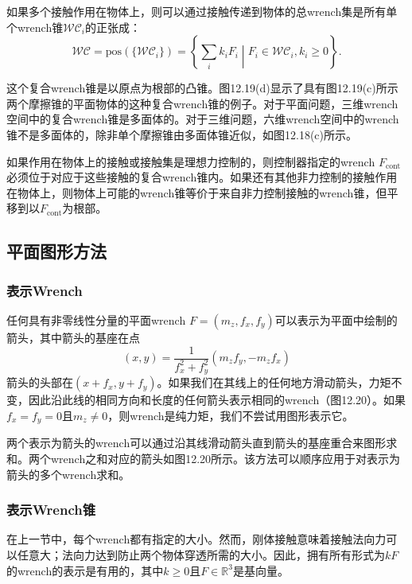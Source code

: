 \documentclass[12pt,a4paper]{article}
\begin{document}
如果多个接触作用在物体上，则可以通过接触传递到物体的总wrench集是所有单个wrench锥$\mathcal{WC}_i$的正张成：
\begin{equation}
\mathcal{WC} = \text{pos}(\{\mathcal{WC}_i\}) = \left\{\sum_i k_i F_i \middle| F_i \in \mathcal{WC}_i, k_i \geq 0 \right\}.
\end{equation}

这个复合wrench锥是以原点为根部的凸锥。图12.19(d)显示了具有图12.19(c)所示两个摩擦锥的平面物体的这种复合wrench锥的例子。对于平面问题，三维wrench空间中的复合wrench锥是多面体的。对于三维问题，六维wrench空间中的wrench锥不是多面体的，除非单个摩擦锥由多面体锥近似，如图12.18(c)所示。

如果作用在物体上的接触或接触集是理想力控制的，则控制器指定的wrench $F_{\text{cont}}$必须位于对应于这些接触的复合wrench锥内。如果还有其他非力控制的接触作用在物体上，则物体上可能的wrench锥等价于来自非力控制接触的wrench锥，但平移到以$F_{\text{cont}}$为根部。

\subsection{平面图形方法}
\label{subsec:planar_graphical_methods_force}

\subsubsection{表示Wrench}
\label{subsubsec:representing_wrenches}

任何具有非零线性分量的平面wrench $F = (m_z, f_x, f_y)$可以表示为平面中绘制的箭头，其中箭头的基座在点
\begin{equation}
(x, y) = \frac{1}{f_x^2 + f_y^2} (m_z f_y, -m_z f_x)
\end{equation}
箭头的头部在$(x + f_x, y + f_y)$。如果我们在其线上的任何地方滑动箭头，力矩不变，因此沿此线的相同方向和长度的任何箭头表示相同的wrench（图12.20）。如果$f_x = f_y = 0$且$m_z \neq 0$，则wrench是纯力矩，我们不尝试用图形表示它。

两个表示为箭头的wrench可以通过沿其线滑动箭头直到箭头的基座重合来图形求和。两个wrench之和对应的箭头如图12.20所示。该方法可以顺序应用于对表示为箭头的多个wrench求和。

\subsubsection{表示Wrench锥}
\label{subsubsec:representing_wrench_cones}

在上一节中，每个wrench都有指定的大小。然而，刚体接触意味着接触法向力可以任意大；法向力达到防止两个物体穿透所需的大小。因此，拥有所有形式为$kF$的wrench的表示是有用的，其中$k \geq 0$且$F \in \mathbb{R}^3$是基向量。
\end{document}

